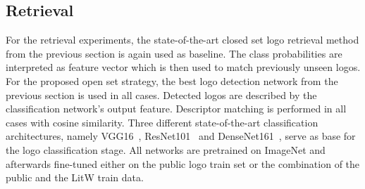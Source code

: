 \documentclass[a4paper,twoside]{article}
\begin{document}
\subsection{Retrieval}
%
For the retrieval experiments, the state-of-the-art closed set logo retrieval method from the previous section is again used as baseline. The class probabilities are interpreted as feature vector which is then used to match previously unseen logos.
For the proposed open set strategy, the best logo detection network from the previous section is used in all cases. Detected logos are described by the classification network's output feature. Descriptor matching is performed in all cases with cosine similarity. Three different state-of-the-art classification architectures, namely VGG16~\cite{simonyan2014}, ResNet101~\cite{he2015} and DenseNet161~\cite{huang2016}, serve as base for the logo classification stage. All networks are pretrained on ImageNet and afterwards fine-tuned either on the public logo train set or the combination of the public and the \ac{LitW} train data.
\end{document}
